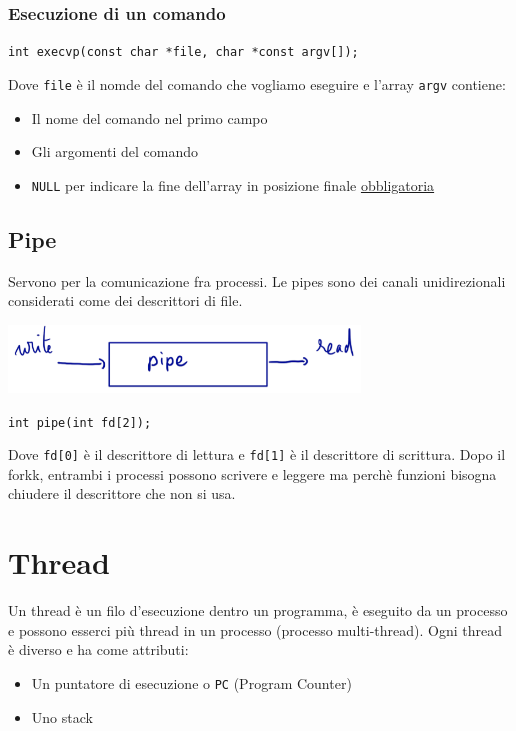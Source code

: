 \documentclass[12pt, a4paper]{report}
\begin{document}
                \subsubsection{Esecuzione di un comando}
                    \begin{center}
                        \texttt{int execvp(const char *file, char *const argv[]);}
                    \end{center}
                    Dove \texttt{file} è il nomde del comando che vogliamo eseguire e l'array \texttt{argv} contiene: 
                    \begin{itemize}
                        \item Il nome del comando nel primo campo
                        \item Gli argomenti del comando
                        \item \texttt{NULL} per indicare la fine dell'array in posizione finale \underline{obbligatoria}
                    \end{itemize}
            \subsection{Pipe}
                Servono per la comunicazione fra processi. Le pipes sono dei canali unidirezionali considerati come dei descrittori di file.
                \begin{center}
                    \includegraphics[width=0.7\textwidth]{Images/pipe.png}
                \end{center}
                \begin{center}
                    \texttt{int pipe(int fd[2]);}
                \end{center}
                Dove \texttt{fd[0]} è il descrittore di lettura e \texttt{fd[1]} è il descrittore di scrittura. Dopo il forkk, entrambi i  processi possono scrivere e leggere ma perchè funzioni bisogna chiudere il descrittore che non si usa.
        \section{Thread}
            Un thread è un filo d'esecuzione dentro un programma, è eseguito da un processo e possono esserci più thread in un processo (processo multi-thread). Ogni thread è diverso e ha come attributi: \begin{itemize}
                \item Un puntatore di esecuzione o \texttt{PC} (Program Counter)
                \item Uno stack
            \end{itemize}
\end{document}
